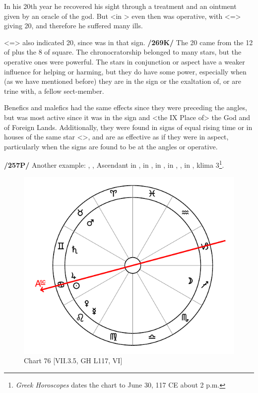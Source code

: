 In his 20th year he recovered his sight through a treatment and an ointment given by an oracle of the god. But \Saturn\xspace <in
\Gemini> even then was operative, with \Gemini\xspace <=\Mercury> giving 20, and therefore he suffered many ills.

\Virgo <=\Mercury> also indicated 20, since \Jupiter was in that sign. \textbf{/269K/} The 20 came from the 12 of \Jupiter\xspace plus the 8 of \Venus\xspace square. The chronocratorship belonged to many stars, but the operative ones were powerful. The stars in conjunction or aspect have a weaker influence for helping or harming, but they do have some power, especially when (as we have mentioned before) they are in the sign or the exaltation of, or are trine with, a fellow sect-member. 

Benefics and malefics had the same effects since they were preceding the angles, but \Jupiter\xspace was most active since it was in the sign and <the IX Place of> the God and of Foreign Lands. Additionally, they were found in signs of equal rising time or in houses of the same star <\Mercury>, and are as effective as if they were in aspect, particularly when the signs are found to be at
the angles or operative.

\textbf{/257P/} Another example: \Sun, \Jupiter, Ascendant in \Cancer, \Moon\xspace in \Sagittarius, \Saturn\xspace in \Gemini,
\Mars\xspace in \Taurus, \Venus, \Mercury\xspace in \Leo, klima 3\footnote{\textit{Greek Horoscopes} dates the chart to June 30, 117 CE about 2 p.m.}.

\begin{figure}
\centering
\vspace{-20pt}
\includegraphics[width=.68\textwidth]{charts/7_3_5}
\caption{Chart 76 [VII.3.5, GH L117, VI]}
\label{fig:chart76}
\end{figure} 

